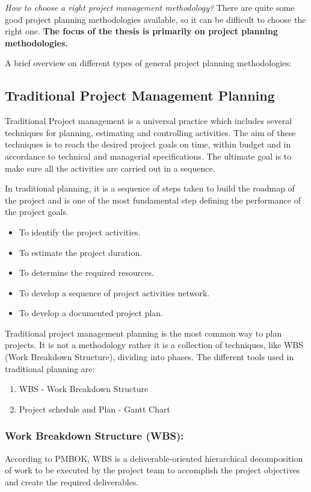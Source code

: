 \emph{How to choose a right project management methodology?}
There are quite some good project planning methodologies available, so it can be difficult to choose the right one. \textbf{The focus of the thesis is primarily on project planning methodologies.}

A brief overview on different types of general project planning methodologies:

\subsection{Traditional Project Management Planning}

Traditional Project management is a universal practice which includes several techniques for planning, estimating and controlling activities. The aim of these techniques is to reach the desired project goals on time, within budget and in accordance to technical and managerial specifications. The ultimate goal is to make sure all the activities are carried out in a sequence.

In traditional planning, it is a sequence of steps taken to build the roadmap of the project and is one of the most fundamental step defining the performance of the project goals.

\begin{itemize}
    \item To identify the project activities. 
    \item To estimate the project duration.
    \item To determine the required resources. 
    \item To develop a sequence of project activities network. 
    \item To develop a documented project plan.
\end{itemize}

Traditional project management planning is the most common way to plan projects. It is not a methodology rather it is a collection of techniques, like WBS (Work Breakdown Structure), dividing into phases. The different tools used in traditional planning are:
\begin{enumerate}
    \item WBS - Work Breakdown Structure
    \item Project schedule and Plan - Gantt Chart 
\end{enumerate}

\subsubsection{ \textbf{Work Breakdown Structure (WBS):} }
 According to PMBOK, WBS is a deliverable-oriented hierarchical decomposition of work to be executed by the project team to accomplish the project objectives and create the required deliverables.

